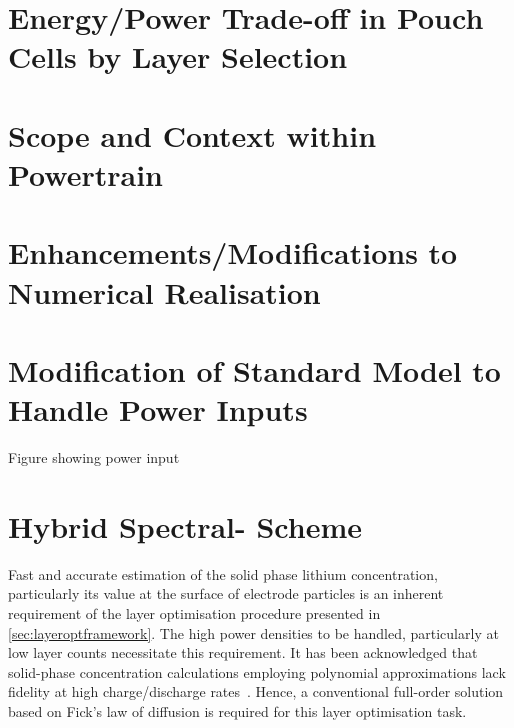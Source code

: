 \section{Energy/Power Trade-off in Pouch Cells by Layer Selection}\label{sec:energypowertradeoff}


\section{Scope and Context within  Powertrain}


\section{Enhancements/Modifications to Numerical Realisation}


\section{Modification of Standard  Model to Handle Power Inputs}\label{sec:innatepowerinput}

Figure showing power input
\section{Hybrid Spectral- Scheme}\label{sec:hybridfv-spectral}

Fast  and  accurate  estimation  of   the  solid  phase  lithium  concentration,
particularly  its   value  at   the  surface  of   electrode  particles   is  an
inherent  requirement   of  the   layer  optimisation  procedure   presented  in
\cref{sec:layeroptframework}.   The  high   power  densities   to  be   handled,
particularly  at  low   layer  counts  necessitate  this   requirement.  It  has
been   acknowledged  that   solid-phase  concentration   calculations  employing
polynomial    approximations   lack    fidelity    at   high    charge/discharge
rates~\cite{Santhanagopalan2006}.  Hence,  a  conventional  full-order  solution
based on Fick's law of diffusion is required for this layer optimisation task.

